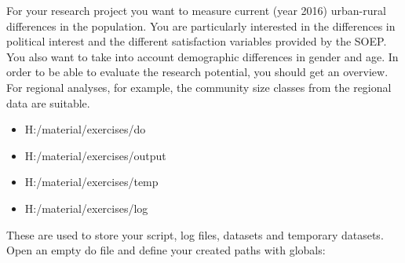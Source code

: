 \documentclass[letterpaper,10pt,openany,onesideH,english]{sphinxmanual}
\begin{document}
For your research project you want to measure current (year 2016) urban-rural differences in the population. You are particularly interested in the differences in political interest and the different satisfaction variables provided by the SOEP.  You also want to take into account demographic differences in gender and age. In order to be able to evaluate the research potential, you should get an overview. For regional analyses, for example, the community size classes from the regional data are suitable.


\begin{figure}[H]
\centering

\noindent{}
\end{figure}

\begin{itemize}
\item {} 
H:/material/exercises/do

\item {} 
H:/material/exercises/output

\item {} 
H:/material/exercises/temp

\item {} 
H:/material/exercises/log

\end{itemize}

These are used to store your script, log files, datasets and temporary datasets. Open an empty do file and define your created paths with globals:
\end{document}
